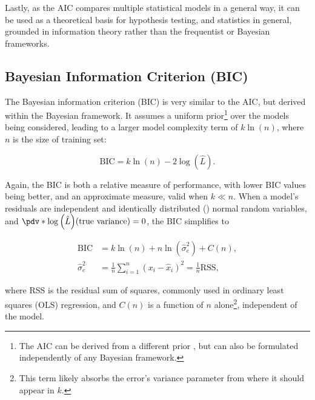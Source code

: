 Lastly, as the AIC compares multiple statistical models in a general way,
it can be used as a theoretical basis for hypothesis testing, and statistics in general,
grounded in information theory rather than the frequentist or Bayesian frameworks.

\subsection{Bayesian Information Criterion (BIC)}
\label{ml_general:eval:BIC}
The Bayesian information criterion (BIC) \cite{10.1214/aos/1176344136}
is very similar to the AIC, but derived within the Bayesian framework.
It assumes a uniform prior\footnote{The AIC can be derived from a different prior \cite{doi:10.1177/0049124104268644},
but can also be formulated independently of any Bayesian framework.} over the models being considered,
leading to a larger model complexity term \cite{1311138} of
$k\ln\left(n\right)$, where $n$ is the size of training set:

\begin{equation} \label{eq:BIC}
\text{BIC} = k\ln\left(n\right) - 2\log\left(\hat{L}\right).
\end{equation}

Again, the BIC is both a relative measure of performance,
with lower BIC values being better,
and an approximate measure, valid when $k \ll n$.
When a model's residuals are independent and identically distributed (\iid) normal random variables,
and $\pdv*{\log\left(\hat{L}\right)}{\left(\text{true variance}\right)} = 0$,
the BIC simplifies \cite{priestley1981spectral} to

\begin{subequations} \label{eq:BIC_gaus_errors}
\begin{align}
\text{BIC} &= k\ln\left(n\right) + n \ln\left(\hat{\sigma}_{e}^{2}\right) + C\left(n\right), \label{eq:BIC_gaus_errors:BIC} \\
\hat{\sigma}_{e}^{2} &= \frac{1}{n} \sum_{i=1}^{n} \left(x_{i} - \hat{x}_{i}\right)^{2} = \frac{1}{n} \text{RSS}, \label{eq:BIC_gaus_errors:RSS}
\end{align}
\end{subequations}

\noindent where RSS is the residual sum of squares,
commonly used in ordinary least squares (OLS) regression,
and $C\left(n\right)$ is a function of $n$ alone\footnote{This term
likely absorbs the error's variance parameter from where it should appear in $k$.}, independent of the model.

